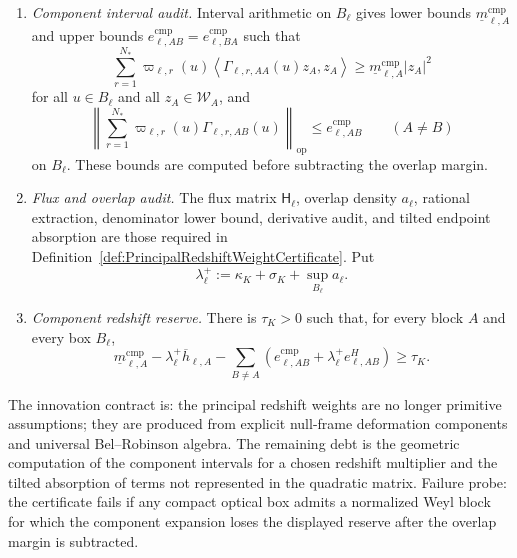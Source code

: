 \begin{definition}
\begin{enumerate}
    \item \emph{Component interval audit.}  Interval arithmetic on $B_\ell$
    gives lower bounds $\underline m^{\mathrm{cmp}}_{\ell,A}$ and upper bounds
    $e^{\mathrm{cmp}}_{\ell,AB}=e^{\mathrm{cmp}}_{\ell,BA}$ such that
    \[
        \sum_{r=1}^{N_*}
        \varpi_{\ell,r}(u)
        \left\langle
        \Gamma_{\ell,r,AA}(u)z_A,z_A
        \right\rangle
        \ge
        \underline m^{\mathrm{cmp}}_{\ell,A}|z_A|^2
    \]
    for all $u\in B_\ell$ and all $z_A\in\mathcal W_A$, and
    \[
        \left\|
        \sum_{r=1}^{N_*}
        \varpi_{\ell,r}(u)\Gamma_{\ell,r,AB}(u)
        \right\|_{\mathrm{op}}
        \le
        e^{\mathrm{cmp}}_{\ell,AB}
        \qquad(A\ne B)
    \]
    on $B_\ell$.  These bounds are computed before subtracting the overlap
    margin.

    \item \emph{Flux and overlap audit.}  The flux matrix $\mathsf H_\ell$,
    overlap density $a_\ell$, rational extraction, denominator lower bound,
    derivative audit, and tilted endpoint absorption are those required in
    Definition~\ref{def:PrincipalRedshiftWeightCertificate}.  Put
    \[
        \lambda_\ell^+
        :=
        \kappa_K+\sigma_K+\sup_{B_\ell}a_\ell .
    \]

    \item \emph{Component redshift reserve.}  There is $\tau_K>0$ such that,
    for every block $A$ and every box $B_\ell$,
    \[
        \underline m^{\mathrm{cmp}}_{\ell,A}
        -
        \lambda_\ell^+\overline h_{\ell,A}
        -
        \sum_{B\ne A}
        \left(
            e^{\mathrm{cmp}}_{\ell,AB}
            +
            \lambda_\ell^+ e^H_{\ell,AB}
        \right)
        \ge
        \tau_K .
    \]
\end{enumerate}
The innovation contract is: the principal redshift weights are no longer
primitive assumptions; they are produced from explicit null-frame deformation
components and universal Bel--Robinson algebra.  The remaining debt is the
geometric computation of the component intervals for a chosen redshift
multiplier and the tilted absorption of terms not represented in the quadratic
matrix.  Failure probe: the certificate fails if any compact optical box admits
a normalized Weyl block for which the component expansion loses the displayed
reserve after the overlap margin is subtracted.
\end{definition}

